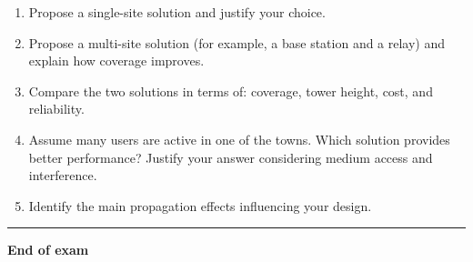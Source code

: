 \documentclass[11pt,a4paper]{article}
\begin{document}
\begin{enumerate}[label=\alph*)]

\item Propose a single-site solution and justify your choice.

\item Propose a multi-site solution (for example, a base station and a relay) and explain how coverage improves.

\item Compare the two solutions in terms of:
coverage, tower height, cost, and reliability.

\item Assume many users are active in one of the towns. Which solution provides better performance? Justify your answer considering medium access and interference.

\item Identify the main propagation effects influencing your design.

\end{enumerate}
\vspace{0.6cm}
\hrule
\vspace{0.3cm}

\textbf{End of exam}




\clearpage
\label{LastPage}

%
\end{document}
